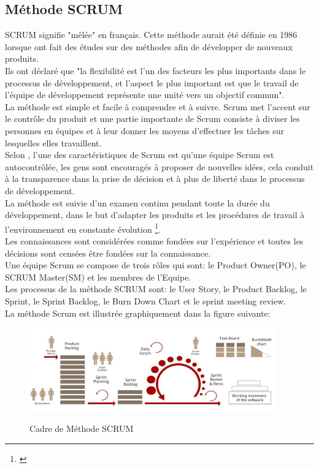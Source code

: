 \subsection{Méthode SCRUM}
SCRUM signifie "mêlée" en français. Cette méthode aurait été définie en 1986 lorsque \cite{takeuchi1986new} ont fait des études sur des méthodes afin de développer de nouveaux produits.\\ Ils ont déclaré que "la flexibilité est l'un des facteurs les plus importants dans le processus de développement, et l'aspect le plus important est que le travail de l'équipe de développement représente une unité vers un objectif commun".\\La méthode est simple et facile à comprendre et à suivre.
Scrum met l'accent sur le contrôle du produit et une partie importante de Scrum consiste à diviser les personnes en équipes et à leur donner les moyens d'effectuer les tâches sur lesquelles elles travaillent.\\
Selon \cite{sverrisdottir2014role}, l'une des caractéristiques de Scrum est qu'une équipe Scrum est autocontrôlée, les gens sont encouragés à proposer de nouvelles idées, cela conduit à la transparence dans la prise de décision et à plus de liberté dans le processus de développement.\\La méthode est suivie d'un examen continu pendant toute la durée du développement, dans le but d'adapter les produits et les procédures de travail à l'environnement en constante évolution \footnote{\cite{sutherland2012scrum}}.\\Les connaissances sont considérées comme fondées sur l'expérience et toutes les décisions sont censées être fondées sur la connaissance.\\
Une équipe Scrum se compose de trois rôles qui sont: le Product Owner(PO), le SCRUM Master(SM) et les membres de l'Equipe.\\ Les processus de la méthode SCRUM sont: le User Story, le Product Backlog, le Sprint, le Sprint Backlog, le Burn Down Chart et le sprint meeting review. \\La méthode Scrum est illustrée graphiquement dans la figure suivante:
\begin{figure}[!h]
	\centering
	{\includegraphics[width=0.95\textwidth]{D) IMAGES/scrum.png}}
	\caption{Cadre de Méthode SCRUM}
	\label{Org}
\end{figure}

